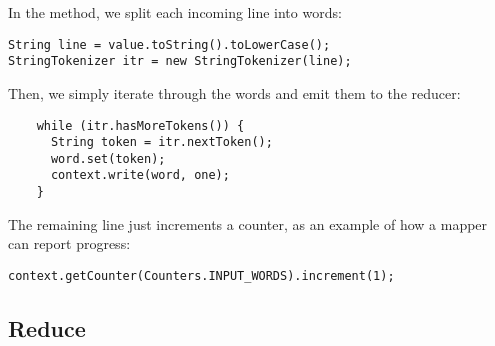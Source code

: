 \documentclass[a4paper,11pt]{article}
\begin{document}
  
  
  In the method, we split each incoming line into words:
  \begin{lstlisting}
String line = value.toString().toLowerCase();
StringTokenizer itr = new StringTokenizer(line);
  \end{lstlisting}
  
  Then, we simply iterate through the words and emit them to the reducer: 
  \begin{lstlisting}
    while (itr.hasMoreTokens()) {
      String token = itr.nextToken();
      word.set(token);
      context.write(word, one);
    }
  \end{lstlisting}
  
  The remaining line just increments a counter, as an example of how a mapper can report progress:
  
  \begin{lstlisting}
context.getCounter(Counters.INPUT_WORDS).increment(1);
\end{lstlisting}


% 

\subsection{Reduce}

\end{document}
